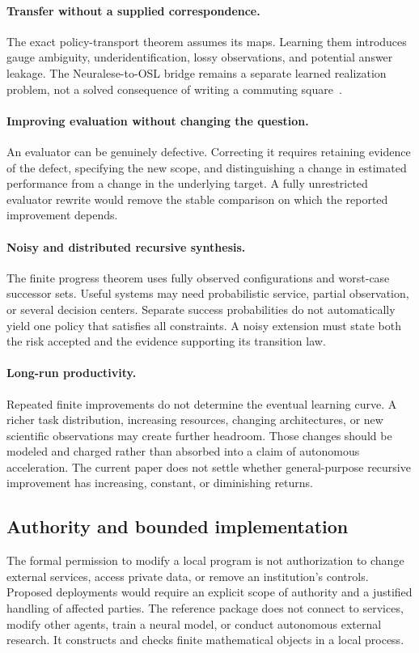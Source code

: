 \documentclass[11pt,letterpaper]{article}
\theoremstyle{plain}
\theoremstyle{definition}
\begin{document}
\paragraph{Transfer without a supplied correspondence.}
The exact policy-transport theorem assumes its maps. Learning them introduces gauge ambiguity, underidentification, lossy observations, and potential answer leakage. The Neuralese-to-OSL bridge remains a separate learned realization problem, not a solved consequence of writing a commuting square~\cite{neuralese}.

\paragraph{Improving evaluation without changing the question.}
An evaluator can be genuinely defective. Correcting it requires retaining evidence of the defect, specifying the new scope, and distinguishing a change in estimated performance from a change in the underlying target. A fully unrestricted evaluator rewrite would remove the stable comparison on which the reported improvement depends.

\paragraph{Noisy and distributed recursive synthesis.}
The finite progress theorem uses fully observed configurations and worst-case successor sets. Useful systems may need probabilistic service, partial observation, or several decision centers. Separate success probabilities do not automatically yield one policy that satisfies all constraints. A noisy extension must state both the risk accepted and the evidence supporting its transition law.

\paragraph{Long-run productivity.}
Repeated finite improvements do not determine the eventual learning curve. A richer task distribution, increasing resources, changing architectures, or new scientific observations may create further headroom. Those changes should be modeled and charged rather than absorbed into a claim of autonomous acceleration. The current paper does not settle whether general-purpose recursive improvement has increasing, constant, or diminishing returns.

\subsection{Authority and bounded implementation}
The formal permission to modify a local program is not authorization to change external services, access private data, or remove an institution's controls. Proposed deployments would require an explicit scope of authority and a justified handling of affected parties. The reference package does not connect to services, modify other agents, train a neural model, or conduct autonomous external research. It constructs and checks finite mathematical objects in a local process.
\end{document}

